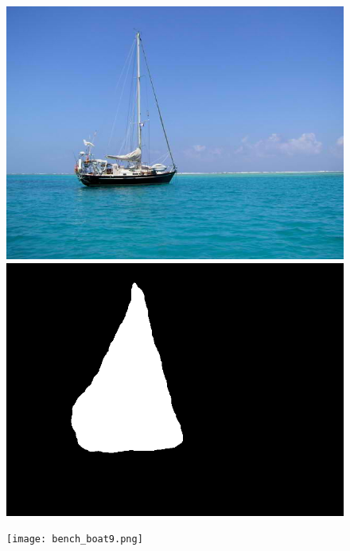 \documentclass[a4paper, 10pt]{article}
\begin{document}
\begin{figure}[H]
\begin{minipage}{.4\textwidth}
\centering
\includegraphics[scale=0.18]{images/boat.jpg}
\end{minipage}%
\begin{minipage}{.4\textwidth}
\centering
\includegraphics[scale=0.18]{images/boat_mask.png}
\end{minipage}%
\begin{minipage}{.4\textwidth}
\centering
\texttt{[image: bench\_boat9.png]}
\end{minipage}%
\end{figure}
\end{document}
